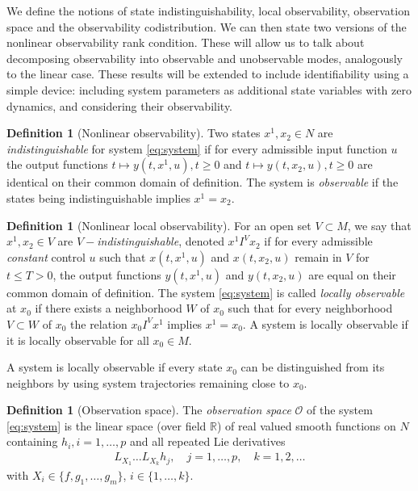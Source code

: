 \documentclass[psamsfonts]{amsart}
\theoremstyle{definition}
\newtheorem{defn}[thm]{Definition}
\theoremstyle{remark}
\newcommand*\R{\mathds{R}}
\numberwithin{equation}{section}
\begin{document}
We define the notions of state indistinguishability, local observability, observation space and the observability codistribution. We can then state two versions of the nonlinear observability rank condition. These will allow us to talk about decomposing observability into observable and unobservable modes, analogously to the linear case. These results will be extended to include identifiability using a simple device: including system parameters as additional state variables with zero dynamics, and considering their observability. 

\begin{defn}[Nonlinear observability]
    Two states $x^1, x_2\in N$ are \textit{indistinguishable} for system \eqref{eq:system} if for every admissible input function $u$ the output functions $t\mapsto y(t, x^1, u), t\geq 0$ and $t\mapsto y(t, x_2, u), t\geq 0$ are identical on their common domain of definition. The system is \textit{observable} if the states being indistinguishable implies $x^1=x_2$. 
\end{defn}

\begin{defn}[Nonlinear local observability]
    For an open set $V\subset M$, we say that $x^1, x_2 \in V$ are \textit{$V-$indistinguishable}, denoted $x^1 I^V x_2$ if for every admissible \textit{constant} control $u$ such that $x(t, x^1, u)$ and $x(t, x_2, u)$ remain in $V$ for $t\leq T > 0$, the output functions $y(t, x^1, u)$ and $y(t, x_2, u)$ are equal on their common domain of definition. The system \eqref{eq:system} is called \textit{locally observable} at $x_0$ if there exists a neighborhood $W$ of $x_0$ such that for every neighborhood $V\subset W$ of $x_0$ the relation $x_0 I^V x^1$ implies $x^1 = x_0$. A system is locally observable if it is locally observable for all $x_0 \in M$. 
\end{defn}

A system is locally observable if every state $x_0$ can be distinguished from its neighbors by using system trajectories remaining close to $x_0$. 

\begin{defn}[Observation space]
    The \textit{observation space} $\mathscr{O}$ of the system \eqref{eq:system} is the linear space (over field $\R$) of real valued smooth functions on $N$ containing $h_i, i = 1, \dots, p$ and all repeated Lie derivatives 
    \begin{align}
        L_{X_1}\dots L_{X_k}h_j, \quad j = 1,\dots, p, \quad k = 1,2, \dots
    \end{align}
    with $X_i \in \{f, g_1, \dots, g_m\}$, $i\in\{1, \dots, k\}$. 
\end{defn}
\end{document}
